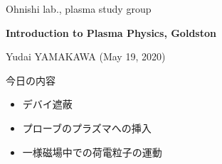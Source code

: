 \documentclass[10pt,dvipdfmx,landscape]{jsarticle}
\begin{document}
%
%
%
\noindent
{\footnotesize
Ohnishi lab., plasma study group    %
}

\noindent
	\textbf{\Large
		Introduction to Plasma Physics, Goldston    %
	}

	\vspace{1ex}

\noindent
	\textrm{\small 
		Yudai YAMAKAWA (May 19, 2020)    %
	}



\vspace{4ex}

\begin{boxnote}
	今日の内容
	\vspace{1mm}
	\begin{itemize}
		\item デバイ遮蔽
		\item プローブのプラズマへの挿入
		\item 一様磁場中での荷電粒子の運動
	\end{itemize}
\end{boxnote}

\newpage
\setcounter{section}{1}
\setcounter{subsection}{6}
\end{document}
